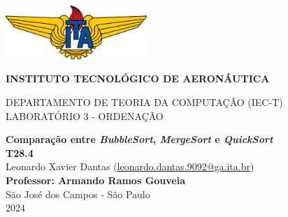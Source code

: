 \documentclass[12pt,a4paper,oneside]{article}
\begin{document}
\begin{center}

\includegraphics[width=0.4\textwidth]{Ita-logo.png}

{\Large \bf INSTITUTO TECNOLÓGICO DE AERONÁUTICA}

{\Large DEPARTAMENTO DE TEORIA DA COMPUTAÇÃO (IEC-T)}\\
{LABORATÓRIO 3 - ORDENAÇÃO}\\[2.0cm]

\vspace{1cm}

{\bf \large Comparação entre \textit{BubbleSort}, \textit{MergeSort} e \textit{QuickSort}}\\[2.5cm]

{\textbf{T28.4}\\
Leonardo Xavier Dantas (\href{mailto:leonardo.dantas.9092@ga.ita.br}{leonardo.dantas.9092@ga.ita.br})
}\\[2.0cm]

{\bf Professor: Armando Ramos Gouveia}\\[2.5cm]

{\large São José dos Campos - São Paulo}\\[0.2cm]
2024

\end{center}

\newpage
\end{document}
